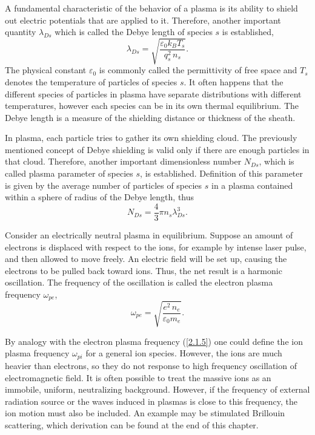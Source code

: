 A fundamental characteristic of the behavior of a plasma is its ability to shield out electric potentials that are applied to it. Therefore, another important quantity $ \lambda_{Ds} $ which is called the Debye length of species $ s $ is established,
\begin{equation}
\label{2.1.3}
\lambda_{Ds} = \sqrt{\frac{\varepsilon_0 k_B T_s}{q_s^2 \, n_s}}.
\end{equation}
The physical constant $ \varepsilon_0 $ is commonly called the permittivity of free space and $ T_s $ denotes the temperature of particles of species $ s $. It often happens that the different species of particles in plasma have separate distributions with different temperatures, however each species can be in its own thermal equilibrium. The Debye length is a measure of the shielding distance or thickness of the sheath.

In plasma, each particle tries to gather its own shielding cloud. The previously mentioned concept of Debye shielding is valid only if there are enough particles in that cloud. Therefore, another important dimensionless number $ N_{Ds} $, which is called plasma parameter of species $ s $, is established. Definition of this parameter is given by the average number of particles of species $ s $ in a plasma contained within a sphere of radius of the Debye length, thus
\begin{equation}
\label{2.1.4}
N_{Ds} = \frac{4}{3} \pi n_s \lambda_{Ds}^3. 
\end{equation}

Consider an electrically neutral plasma in equilibrium. Suppose an amount of electrons is displaced with respect to the ions, for example by intense laser pulse, and then allowed to move freely. An electric field will be set up, causing the electrons to be pulled back toward ions. Thus, the net result is a harmonic oscillation. The frequency of the oscillation is called the electron plasma frequency $ \omega_{pe} $,
\begin{equation}
\label{2.1.5}
\omega_{pe} = \sqrt{\frac{e^{2}\,n_e}{\varepsilon_0 m_e}}.
\end{equation}

By analogy with the electron plasma frequency (\ref{2.1.5}) one could define the ion plasma frequency $ \omega_{pi} $ for a general ion species. However, the ions are much heavier than electrons, so they do not response to high frequency oscillation of electromagnetic field. It is often possible to treat the massive ions as an immobile, uniform, neutralizing background. However, if the frequency of external radiation source or the waves induced in plasmas is close to this frequency, the ion motion must also be included. An example may be stimulated Brillouin scattering, which derivation can be found at the end of this chapter.

